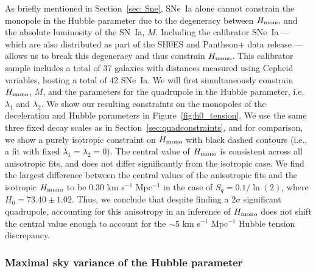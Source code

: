 \documentclass[fleqn,usenatbib]{mnras}
\newcommand{\hay}[1]{{\color[rgb]{0.7,0.0,0.7} {\textbf{[HMC: #1]}}}}
\begin{document}
{As briefly mentioned in Section~\ref{sec: Sne}}, SNe~Ia alone cannot constrain the monopole in the Hubble parameter %
{due to} the degeneracy between $H_{\rm mono}$ and the absolute luminosity of the SN~Ia, $M$.
{Including the}
calibrator SNe~Ia --- which are also distributed as part of the SH0ES and Pantheon+ data release --- {allows us to break this degeneracy and thus constrain $H_{\rm mono}$}. This {calibrator sample} includes a total of 37 galaxies with distances measured using Cepheid variables, hosting a total of 42 SNe~Ia. 
{We will first} 
simultaneously constrain $H_{\rm mono}$, $M$, and the parameters for {the} quadrupole {in the Hubble parameter}, i.e. $\lambda_1$ and $\lambda_2$. 
{We show our} resulting constraints {on the monopoles of the deceleration and Hubble parameters} 
in Figure~\ref{fig:h0_tension}. 
We use the same three fixed decay scales as in Section~\ref{sec:quadconstraints}, and for comparison, we show a purely isotropic constraint on $H_{\rm mono}$ with black dashed contours {(i.e., a fit with fixed $\lambda_1=\lambda_2=0$)}. 
{
The central value of $H_{\rm mono}$ {is %
{consistent across} all anisotropic fits, and }
does not differ significantly from the isotropic case. {We find the} largest difference {between the central values of the anisotropic fits and} the %
isotropic $H_{\rm mono}$ {to be} {0.30 km s$^{-1}$ Mpc$^{-1}$ in the case of $S_q = 0.1/\ln(2)$, where $H_0 = 73.40 \pm 1.02 $}. 
{Thus, we conclude} that despite finding a %
{2$\sigma$ significant} quadrupole, {accounting for this anisotropy in an inference of $H_{\rm mono}$ does not shift the central value enough to account for the $\sim 5$ km s$^{-1}$ Mpc$^{-1}$ Hubble tension discrepancy. }
}


\subsubsection{Maximal sky variance of the Hubble parameter}
\end{document}
